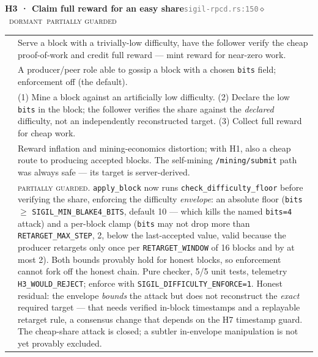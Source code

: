 \documentclass[10pt,a4paper]{article}
\makeatletter
\newcommand{\stD}{\textcolor{sigilviolet}{$\diamond$}~{\scriptsize\textcolor{sigilviolet}{\textsc{dormant}}}}
\newcommand{\svMod}{{\scriptsize\textcolor{sigilblue}{\textsc{moderate}}}}
\newcommand{\mgPartial}{{\scriptsize\textcolor{sigilviolet}{\textsc{partially guarded}}}}
\newcommand{\frow}[2]{{\footnotesize\textcolor{gray}{\textsc{#1}}}\;&\small #2\\}
\newenvironment{atkentry}[5]{%
\begin{tcolorbox}[enhanced,breakable,colback=white,colframe=slate,boxrule=0.6pt,arc=2pt,
  left=8pt,right=8pt,top=6pt,bottom=6pt,
  borderline west={3pt}{0pt}{sigilred!60!slate}]
{\small\textbf{#1 · #2}\hfill{\footnotesize\textcolor{gray}{\texttt{#3}}}\quad#4\quad#5}\\[4pt]
\begin{tabular}{@{}>{\raggedleft\arraybackslash}p{2.1cm}p{12.9cm}@{}}
}{%
\end{tabular}
\end{tcolorbox}\vspace{2pt}}
\makeatother
\begin{document}
\begin{atkentry}{H3}{Claim full reward for an easy share}{sigil-rpcd.rs:150}{\svMod}{\stD~\mgPartial}
\frow{goal}{Serve a block with a trivially-low difficulty, have the follower verify the
cheap proof-of-work and credit full reward — mint reward for near-zero work.}
\frow{preconditions}{A producer/peer role able to gossip a block with a chosen
\texttt{bits} field; enforcement off (the default).}
\frow{steps}{(1) Mine a block against an artificially low difficulty. (2) Declare the low
\texttt{bits} in the block; the follower verifies the share against the \emph{declared}
difficulty, not an independently reconstructed target. (3) Collect full reward for cheap
work.}
\frow{buys}{Reward inflation and mining-economics distortion; with H1, also a cheap route to
producing accepted blocks. The self-mining \texttt{/mining/submit} path was always safe —
its target is server-derived.}
\frow{defense}{\mgPartial{}. \texttt{apply\_block} now runs \texttt{check\_difficulty\_floor}
before verifying the share, enforcing the difficulty \emph{envelope}: an absolute floor
(\texttt{bits} $\geq$ \texttt{SIGIL\_MIN\_BLAKE4\_BITS}, default 10 — which kills the named
\texttt{bits=4} attack) and a per-block clamp (\texttt{bits} may not drop more than
\texttt{RETARGET\_MAX\_STEP}, 2, below the last-accepted value, valid because the producer
retargets only once per \texttt{RETARGET\_WINDOW} of 16 blocks and by at most 2). Both
bounds provably hold for honest blocks, so enforcement cannot fork off the honest chain.
Pure checker, 5/5 unit tests, telemetry \texttt{H3\_WOULD\_REJECT}; enforce with
\texttt{SIGIL\_DIFFICULTY\_ENFORCE=1}. Honest residual: the envelope \emph{bounds} the
attack but does not reconstruct the \emph{exact} required target — that needs verified
in-block timestamps and a replayable retarget rule, a consensus change that depends on the
H7 timestamp guard. The cheap-share attack is closed; a subtler in-envelope manipulation is
not yet provably excluded.}
\end{atkentry}
\end{document}
